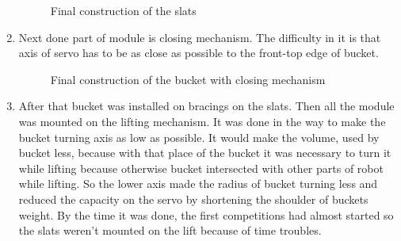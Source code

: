 \begin{enumerate}
\begin{figure}[H]
\begin{minipage}[h]{0.47\linewidth}
  		\caption{Final construction of the slats}
  	\end{minipage}
  \end{figure}
  
  \item Next done part of module is closing mechanism. The difficulty in it is that axis of servo has to be as close as possible to the front-top edge of bucket.
  
  \begin{figure}[H]
  	\begin{minipage}[h]{1\linewidth}
  		\caption{Final construction of the bucket with closing mechanism}
  	\end{minipage}
  \end{figure}
  
  \item After that bucket was installed on bracings on the slats. Then all the module was mounted on the lifting mechanism. It was done in the way to make the bucket turning axis as low as possible. It would make the volume, used by bucket less, because with that place of the bucket it was necessary to turn it while lifting because otherwise bucket intersected with other parts of robot while lifting. So the lower axis made the radius of bucket turning less and reduced the capacity on the servo by shortening the shoulder of buckets weight.
  By the time it was done, the first competitions had almost started so the slats weren't mounted on the lift because of time troubles.
  

\end{enumerate}
